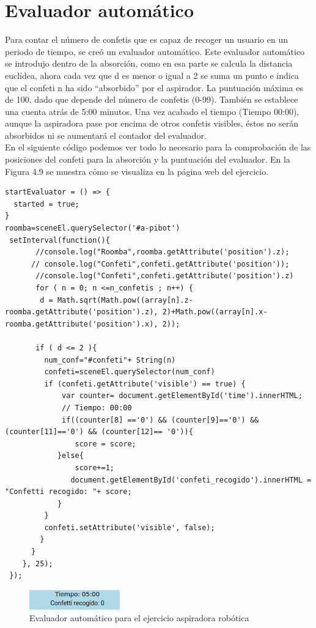 \section{Evaluador automático}
Para contar el número de confetis que es capaz de recoger un usuario en un periodo de tiempo, se creó un evaluador automático. Este evaluador automático se introdujo dentro de la absorción, como en esa parte se calcula la distancia euclídea, ahora cada vez que d es menor o igual a 2 se suma un punto e indica que el confeti n ha sido  ``absorbido'' por el aspirador. La puntuación máxima es de 100, dado que depende del número de confetis (0-99). También se establece una cuenta atrás de 5:00 minutos. Una vez acabado el tiempo (Tiempo 00:00), aunque la aspiradora pase por encima de otros confetis visibles, éstos no serán absorbidos ni se aumentará el contador del evaluador.
\\

En el siguiente código podemos ver todo lo necesario para la comprobación de las posiciones del confeti para la absorción y  la puntuación del evaluador. En la Figura 4.9 se muestra cómo se visualiza en la página web del ejercicio.

\begin{lstlisting}
startEvaluator = () => {
  started = true;
}
roomba=sceneEl.querySelector('#a-pibot')
 setInterval(function(){
       //console.log("Roomba",roomba.getAttribute('position').z);
      // console.log("Confeti",confeti.getAttribute('position'));
       //console.log("Confeti",confeti.getAttribute('position').z)
       for ( n = 0; n <=n_confetis ; n++) {
        d = Math.sqrt(Math.pow((array[n].z-roomba.getAttribute('position').z), 2)+Math.pow((array[n].x-roomba.getAttribute('position').x), 2));

       if ( d <= 2 ){
         num_conf="#confeti"+ String(n)
         confeti=sceneEl.querySelector(num_conf)
         if (confeti.getAttribute('visible') == true) {
	         var counter= document.getElementById('time').innerHTML;
		     // Tiempo: 00:00	
	         if((counter[8] =='0') && (counter[9]=='0') && (counter[11]=='0') && (counter[12]== '0')){      
	 	        score = score;
		    }else{
	 	        score+=1;
		       document.getElementById('confeti_recogido').innerHTML = "Confetti recogido: "+ score;
		    }
         }
         confeti.setAttribute('visible', false);
        }
      }
    }, 25);
 });
\end{lstlisting}

 \begin{figure}[H]
  \centering
 \includegraphics[width=0.35\textwidth]{chapters/images/evaluadoraspiradora.png}
  \caption{Evaluador automático para el ejercicio aspiradora robótica}
\end{figure}
